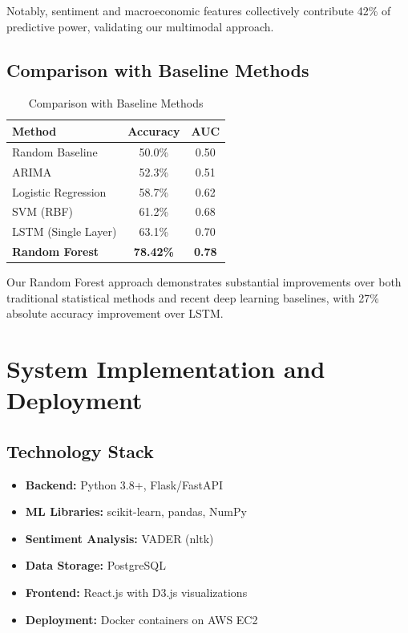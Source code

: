 \documentclass[conference]{IEEEtran}
\begin{document}
Notably, sentiment and macroeconomic features collectively contribute 42\% of predictive power, validating our multimodal approach.

\subsection{Comparison with Baseline Methods}

\begin{table}[h]
\centering
\small
\setlength{\tabcolsep}{6pt}
\begin{tabular}{lcc}
\toprule
\textbf{Method} & \textbf{Accuracy} & \textbf{AUC} \\
\midrule
Random Baseline & 50.0\% & 0.50 \\
ARIMA & 52.3\% & 0.51 \\
Logistic Regression & 58.7\% & 0.62 \\
SVM (RBF) & 61.2\% & 0.68 \\
LSTM (Single Layer) & 63.1\% & 0.70 \\
\textbf{Random Forest} & \textbf{78.42\%} & \textbf{0.78} \\
\bottomrule
\end{tabular}
\caption{Comparison with Baseline Methods}
\label{tab:comparison}
\end{table}

Our Random Forest approach demonstrates substantial improvements over both traditional statistical methods and recent deep learning baselines, with 27\% absolute accuracy improvement over LSTM.

\section{System Implementation and Deployment}

\subsection{Technology Stack}

\begin{itemize}
\item \textbf{Backend:} Python 3.8+, Flask/FastAPI
\item \textbf{ML Libraries:} scikit-learn, pandas, NumPy
\item \textbf{Sentiment Analysis:} VADER (nltk)
\item \textbf{Data Storage:} PostgreSQL
\item \textbf{Frontend:} React.js with D3.js visualizations
\item \textbf{Deployment:} Docker containers on AWS EC2
\end{itemize}
\end{document}
